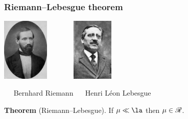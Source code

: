\begin{frame}
  \frametitle{Riemann--Lebesgue theorem}

  \begin{center}
  \includegraphics[height=30mm]{446px-Bernhard_Riemann_2.jpg} $\quad \qquad$
  \includegraphics[height=30mm]{Lebesgue2.jpg}
  
  $\quad$ Bernhard Riemann $\quad$ Henri L\'eon Lebesgue
  \end{center}
  
  \bigskip
  \bigskip

  
  {\bf Theorem} (Riemann--Lebesgue). If $\mu \ll \la$ then $\mu \in \mathscr{R}$. 
  
  \bigskip
  \bigskip
  \bigskip
  
\end{frame}



